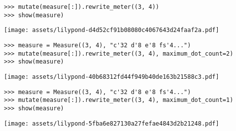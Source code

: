 \begin{comment}
<abjad>
mutate(measure[:]).rewrite_meter((3, 4))
show(measure)
</abjad>
\end{comment}

\begin{singlespacing}
\vspace{-0.5\baselineskip}
\begin{lstlisting}
>>> mutate(measure[:]).rewrite_meter((3, 4))
>>> show(measure)
\end{lstlisting}
\noindent\texttt{[image: assets/lilypond-d4d52cf91b08080c4067643d24faaf2a.pdf]}
\end{singlespacing}

\begin{comment}
<abjad>
measure = Measure((3, 4), "c'32 d'8 e'8 fs'4...")
mutate(measure[:]).rewrite_meter((3, 4), maximum_dot_count=2)
show(measure)
</abjad>
\end{comment}

\begin{singlespacing}
\vspace{-0.5\baselineskip}
\begin{lstlisting}
>>> measure = Measure((3, 4), "c'32 d'8 e'8 fs'4...")
>>> mutate(measure[:]).rewrite_meter((3, 4), maximum_dot_count=2)
>>> show(measure)
\end{lstlisting}
\noindent\texttt{[image: assets/lilypond-40b68312fd44f949b40de163b21588c3.pdf]}
\end{singlespacing}

\begin{comment}
<abjad>
measure = Measure((3, 4), "c'32 d'8 e'8 fs'4...")
mutate(measure[:]).rewrite_meter((3, 4), maximum_dot_count=1)
show(measure)
</abjad>
\end{comment}

\begin{singlespacing}
\vspace{-0.5\baselineskip}
\begin{lstlisting}
>>> measure = Measure((3, 4), "c'32 d'8 e'8 fs'4...")
>>> mutate(measure[:]).rewrite_meter((3, 4), maximum_dot_count=1)
>>> show(measure)
\end{lstlisting}
\noindent\texttt{[image: assets/lilypond-5fba6e827130a27fefae4843d2b21248.pdf]}
\end{singlespacing}

\begin{comment}
<abjad>
measure = Measure((3, 4), "c'32 d'8 e'8 fs'4...")
mutate(measure[:]).rewrite_meter((3, 4), maximum_dot_count=0)
show(measure)
</abjad>
\end{comment}


